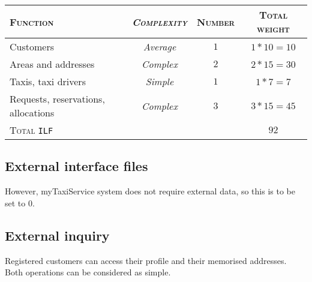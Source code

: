 \begin{table*}\begin{tabularx}{\textwidth}{ X >{\itshape}C{\myWFP} C{\myWFP} C{\myWFP} }

\toprule
	
	\normalfont\textsc{Function} &
	\normalfont\textsc{Complexity}	& 
	\normalfont\textsc{Number} &
	\normalfont\textsc{Total weight} \\

\toprule

	Customers	& Average	& $ 1 $		& $ 1*10 = 10 $ \\
\midrule
	Areas and addresses		& Complex	& $ 2 $		& $ 2*15 = 30 $ \\
\midrule
	Taxis, taxi drivers		& Simple		& $ 1 $		& $ 1*7 = 7 $ \\
\midrule
	Requests, reservations, allocations	& Complex	& $ 3 $ 	& $ 3*15 = 45 $ \\

\bottomrule

\normalfont\textsc{Total} \texttt{ILF} && & $ 92 $ \\

\bottomrule


\end{tabularx}\end{table*}





\subsection*{External interface files} 


However, myTaxiService system does not require external data, so this is to be set to $ 0 $.







\subsection*{External inquiry}
 

Registered customers can access their profile and their memorised addresses. Both operations can be considered as simple.


